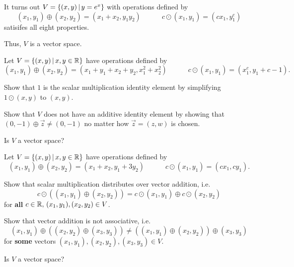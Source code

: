 \begin{remark}
  It turns out \(V=\left\{(x,y)\,\middle|\,y=e^x\right\}\) with operations defined by
  \[
    (x_1,y_1)\oplus (x_2,y_2)=(x_1+x_2,y_1y_2)
      \hspace{3em}
    c\odot (x_1,y_1)=(cx_1,y_1^c)
  \]
  satisifes all eight properties.

  \vectorSpaceProperties

  Thus, \(V\) is a vector space.
\end{remark}





\begin{activity}{15}
  Let \(V=\left\{(x,y)\,\middle|\,x,y\in\mathbb{R}\right\}\) have operations defined by
  \[
    (x_1,y_1)\oplus (x_2,y_2)=(x_1+y_1+x_2+y_2,x_1^2+x_2^2)
      \hspace{3em}
    c\odot (x_1,y_1)=(x_1^c,y_1+c-1)
  .\]

  \begin{subactivity}
    Show that \(1\) is the scalar multiplication identity element
	by simplifying \(1\odot(x,y)\) to \((x,y)\).
  \end{subactivity}

  \begin{subactivity}
    Show that \(V\) does not have an additive identity element by showing that 
	\((0,-1)\oplus\vec z\not=(0,-1)\) no matter how
    \(\vec z=(z,w)\) is chosen.
  \end{subactivity}

  \begin{subactivity}
    Is \(V\) a vector space?
  \end{subactivity}
\end{activity}

\begin{activity}{15}
  Let \(V=\left\{(x,y)\,\middle|\,x,y\in\mathbb{R}\right\}\) have operations defined by
  \[
    (x_1,y_1)\oplus (x_2,y_2)=(x_1+x_2,y_1+3y_2)
      \hspace{3em}
    c\odot (x_1,y_1)=(cx_1,cy_1)
  .\]

  \begin{subactivity}
    Show that scalar multiplication distributes over vector addition, i.e.
	\[ c \odot \left( (x_1,y_1) \oplus (x_2,y_2) \right) = c\odot (x_1,y_1) \oplus c\odot (x_2,y_2)\]
	for \textbf{all} \(c\in \mathbb{R},\, (x_1,y_1),(x_2,y_2) \in V\). 
\end{subactivity}

  \begin{subactivity}
    Show that vector addition is not associative, i.e. 
  \[ (x_1,y_1) \oplus \left((x_2,y_2) \oplus (x_3,y_3)\right) \neq \left((x_1,y_1)\oplus (x_2,y_2)\right) \oplus (x_3,y_3)\]
  for \textbf{some} vectors \( (x_1,y_1), (x_2,y_2), (x_3,y_3) \in V\).
  \end{subactivity}

  \begin{subactivity}
    Is \(V\) a vector space?
  \end{subactivity}
\end{activity}



